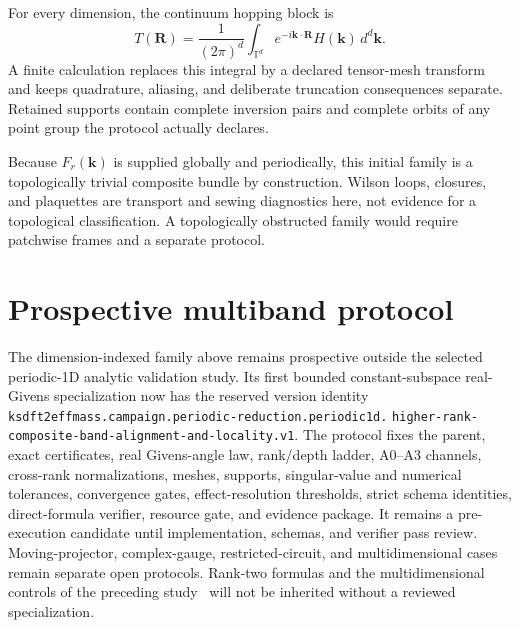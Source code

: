 \documentclass[11pt]{article}
\newenvironment{prospective}{\color{prospectivered}}{}
\begin{document}
\begin{prospective}
For every dimension, the continuum hopping block is
\begin{equation}
 T(\mathbf R)=\frac{1}{(2\pi)^d}
 \int_{\mathbb T^d}e^{-i\mathbf k\cdot\mathbf R}
 H(\mathbf k)\,d^d\mathbf k.
\end{equation}
A finite calculation replaces this integral by a declared tensor-mesh transform and
keeps quadrature, aliasing, and deliberate truncation consequences separate. Retained
supports contain complete inversion pairs and complete orbits of any point group the
protocol actually declares.

Because $F_r(\mathbf k)$ is supplied globally and periodically, this initial family is a
topologically trivial composite bundle by construction. Wilson loops, closures, and
plaquettes are transport and sewing diagnostics here, not evidence for a topological
classification. A topologically obstructed family would require patchwise frames and a
separate protocol.

\section{Prospective multiband protocol}
The dimension-indexed family above remains prospective outside the selected periodic-1D analytic validation study. Its first bounded
constant-subspace real-Givens specialization now has the reserved version identity
\texttt{ksdft2effmass.campaign.periodic-reduction.periodic1d.}
\texttt{higher-rank-composite-band-alignment-and-locality.v1}.
The protocol fixes the parent, exact certificates, real Givens-angle law, rank/depth
ladder, A0--A3 channels, cross-rank normalizations, meshes, supports, singular-value and
numerical tolerances, convergence gates, effect-resolution thresholds, strict schema
identities, direct-formula verifier, resource gate, and evidence package. It remains a
pre-execution candidate until implementation, schemas, and verifier pass review.
Moving-projector, complex-gauge, restricted-circuit, and multidimensional cases remain
separate open protocols. Rank-two formulas and the multidimensional controls of the
preceding study~\cite{Ragasa2026b} will not be inherited without a reviewed
specialization.


\end{prospective}
\end{document}
